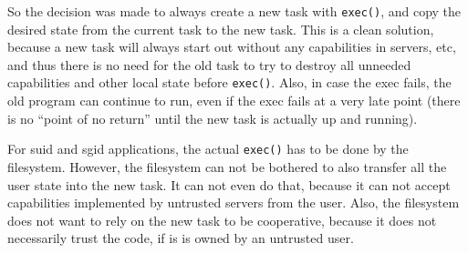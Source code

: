 \documentclass[9pt,a4paper]{extarticle}
\begin{document}
So the decision was made to always create a new task with
\texttt{exec()}, and copy the desired state from the current task to
the new task.  This is a clean solution, because a new task will
always start out without any capabilities in servers, etc, and thus
there is no need for the old task to try to destroy all unneeded
capabilities and other local state before \texttt{exec()}.  Also, in
case the exec fails, the old program can continue to run, even if the
exec fails at a very late point (there is no ``point of no return''
until the new task is actually up and running).

For suid and sgid applications, the actual \texttt{exec()} has to be
done by the filesystem.  However, the filesystem can not be bothered
to also transfer all the user state into the new task.  It can not
even do that, because it can not accept capabilities implemented by
untrusted servers from the user.  Also, the filesystem does not want
to rely on the new task to be cooperative, because it does not
necessarily trust the code, if is is owned by an untrusted user.
\end{document}
